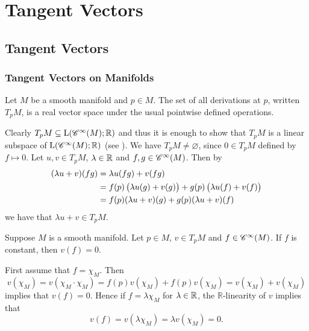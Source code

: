 \chapter{Tangent Vectors}
\section{Tangent Vectors}
\subsection{Tangent Vectors on Manifolds}

\begin{exercise}
	Let $M$ be a smooth manifold and $p \in M$. The set of all derivations at $p$, written $T_pM$, is a real vector space under the usual pointwise defined operations.
\end{exercise}

\begin{solution}
	Clearly $T_pM \subseteq \mathrm{L}(\mathscr{C}^\infty(M);\mathbb{R})$ and thus it is enough to show that $T_pM$ is a linear subspace of $\mathrm{L}(\mathscr{C}^\infty(M);\mathbb{R})$ (see \cite[626]{lee:smooth_manifolds:2013}). We have $T_pM \neq \varnothing$, since $0 \in T_pM$ defined by $f \mapsto 0$. Let $u,v \in T_pM$, $\lambda \in \mathbb{R}$ and $f,g \in \mathscr{C}^\infty(M)$. Then by
	\begin{align*}
		(\lambda u + v)(fg) &= \lambda u(fg) + v(fg)\\
		&= f(p)\del[1]{\lambda u(g) + v(g)} + g(p)\del[1]{\lambda u(f) + v(f)}\\
		&= f(p)(\lambda u + v)(g) + g(p)(\lambda u + v)(f) 
	\end{align*}
	\noindent we have that $\lambda u + v \in T_pM$.
\end{solution}

\begin{exercise}
	Suppose $M$ is a smooth manifold. Let $p \in M$, $v \in T_pM$ and $f \in \mathscr{C}^\infty(M)$. If $f$ is constant, then $v(f) = 0$.
\end{exercise}

\begin{solution}
	First assume that $f = \chi_M$. Then 
	\begin{equation}
		v(\chi_M) = v(\chi_M\cdot \chi_M) = f(p)v(\chi_M) + f(p)v(\chi_M) = v(\chi_M) + v(\chi_M)
	\end{equation}
	\noindent implies that $v(f) = 0$. Hence if $f = \lambda\chi_M$ for $\lambda \in \mathbb{R}$, the $\mathbb{R}$-linearity of $v$ implies that
	\begin{equation}
		v(f) = v(\lambda\chi_M) = \lambda v(\chi_M) = 0.	
	\end{equation}
\end{solution}

